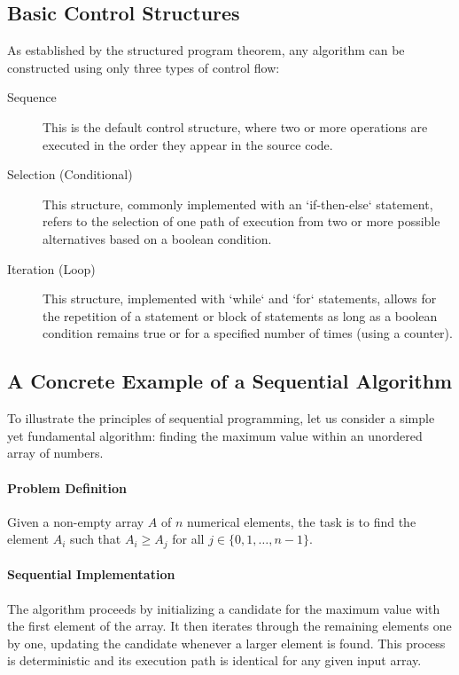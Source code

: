 \subsection{Basic Control Structures}
As established by the structured program theorem, any algorithm can be constructed using only three types of control flow:
\begin{description}
    \item[Sequence] This is the default control structure, where two or more operations are executed in the order they appear in the source code.
    \item[Selection (Conditional)] This structure, commonly implemented with an `if-then-else` statement, refers to the selection of one path of execution from two or more possible alternatives based on a boolean condition.
    \item[Iteration (Loop)] This structure, implemented with `while` and `for` statements, allows for the repetition of a statement or block of statements as long as a boolean condition remains true or for a specified number of times (using a counter).
\end{description}

\subsection{A Concrete Example of a Sequential Algorithm}
To illustrate the principles of sequential programming, let us consider a simple yet fundamental algorithm: finding the maximum value within an unordered array of numbers.

\paragraph{Problem Definition}
Given a non-empty array $A$ of $n$ numerical elements, the task is to find the element $A_i$ such that $A_i \ge A_j$ for all $j \in \{0, 1, \dots, n-1\}$.

\paragraph{Sequential Implementation}
The algorithm proceeds by initializing a candidate for the maximum value with the first element of the array. It then iterates through the remaining elements one by one, updating the candidate whenever a larger element is found. This process is deterministic and its execution path is identical for any given input array.

